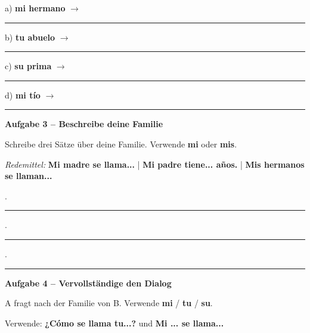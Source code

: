 \documentclass[11pt, a4paper]{article}
\newcommand{\fachfarbe}{spanisch}
\newcommand{\punktebox}[1]{\hfill\fbox{\small \_/#1}}
\newcommand{\luecke}[1]{\rule{#1}{0.4pt}}
\newenvironment{aufgabe}[1]{%
    \needspace{5\baselineskip}%
    \nopagebreak[4]%
    \vspace{10pt}
    \noindent\textbf{\textcolor{\fachfarbe}{Aufgabe #1}}
    \nopagebreak[4]%
    \vspace{5pt}
    \nopagebreak[4]%
    \begin{list}{}{\leftmargin=0pt}
    \item[]
}{%
    \end{list}
}
\newcommand{\es}[1]{\textcolor{\fachfarbe}{\textbf{#1}}}
\begin{document}
\noindent
a) \es{mi hermano} $\rightarrow$ \luecke{5cm}

\vspace{0.8em}

\noindent
b) \es{tu abuelo} $\rightarrow$ \luecke{5cm}

\vspace{0.8em}

\noindent
c) \es{su prima} $\rightarrow$ \luecke{5cm}

\vspace{0.8em}

\noindent
d) \es{mi tío} $\rightarrow$ \luecke{5cm}

\vspace{15pt}


\begin{aufgabe}{3 -- Beschreibe deine Familie}
Schreibe drei Sätze über deine Familie. Verwende \es{mi} oder \es{mis}. \punktebox{6}
\end{aufgabe}

\begin{vokabelkasten}
\textit{Redemittel:} \es{Mi madre se llama...} | \es{Mi padre tiene... años.} | \es{Mis hermanos se llaman...}
\end{vokabelkasten}

\vspace{0.8em}

. \rule{\textwidth}{0.4pt}

\vspace{1.5em}

. \rule{\textwidth}{0.4pt}

\vspace{1.5em}

. \rule{\textwidth}{0.4pt}

\vspace{15pt}


\begin{aufgabe}{4 -- Vervollständige den Dialog}
A fragt nach der Familie von B. Verwende \es{mi} / \es{tu} / \es{su}. \punktebox{6}
\end{aufgabe}

\begin{hinweis}
Verwende: \es{¿Cómo se llama tu...?} und \es{Mi ... se llama...}
\end{hinweis}
\end{document}
